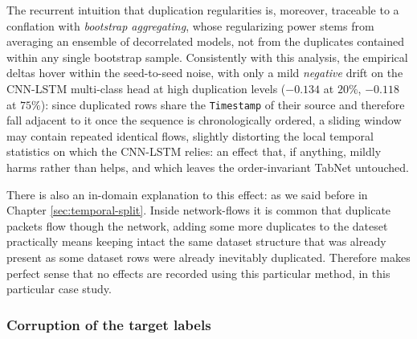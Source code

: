 \documentclass[../main.tex]{subfiles}
\begin{document}
The recurrent intuition that duplication regularities is, moreover, traceable to a conflation with \emph{bootstrap aggregating}, whose regularizing power stems from averaging an ensemble of decorrelated models, not from the duplicates contained within any single bootstrap sample. Consistently with this analysis, the empirical deltas hover within the seed-to-seed noise, with only a mild \emph{negative} drift on the CNN-LSTM multi-class head at high duplication levels ($-0.134$ at $20\%$, $-0.118$ at $75\%$): since duplicated rows share the \texttt{Timestamp} of their source and therefore fall adjacent to it once the sequence is chronologically ordered, a sliding window may contain repeated identical flows, slightly distorting the local temporal statistics on which the CNN-LSTM relies: an effect that, if anything, mildly harms rather than helps, and which leaves the order-invariant TabNet untouched. 

There is also an in-domain explanation to this effect: as we said before in Chapter \ref{sec:temporal-split}. Inside network-flows it is common that duplicate packets flow though the network, adding some more duplicates to the dateset practically means keeping intact the same dataset structure that was already present as some dataset rows were already inevitably duplicated. Therefore makes perfect sense that no effects are recorded using this particular method, in this particular case study.



\newpage
\subsubsection{Corruption of the target labels}
\label{sec:res-B-single-label}
\end{document}
